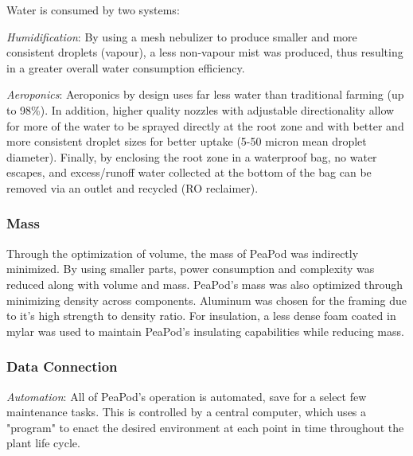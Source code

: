 \documentclass{report}
\begin{document}

Water is consumed by two systems:

\textit{Humidification}: By using a mesh nebulizer to produce smaller and more consistent droplets (vapour), a less non-vapour mist was produced, thus resulting in a greater overall water consumption efficiency.

\textit{Aeroponics}: Aeroponics by design uses far less water than traditional farming (up to 98\%). In addition, higher quality nozzles with adjustable directionality allow for more of the water to be sprayed directly at the root zone and with better and more consistent droplet sizes for better uptake (5-50 micron mean droplet diameter). Finally, by enclosing the root zone in a waterproof bag, no water escapes, and excess/runoff water collected at the bottom of the bag can be removed via an outlet and recycled (RO reclaimer).

\subsubsection{Mass} 
\label{sec:constraints-mass}

Through the optimization of volume, the mass of PeaPod was indirectly minimized. By using smaller parts, power consumption and complexity was reduced along with volume and mass. PeaPod's mass was also optimized through minimizing density across components. Aluminum was chosen for the framing due to it's high strength to density ratio. For insulation, a less dense foam coated in mylar was used to maintain PeaPod's insulating capabilities while reducing mass.

\subsubsection{Data Connection} 
\label{sec:constraints-data}



\textit{Automation}: All of PeaPod's operation is automated, save for a select few maintenance tasks. This is controlled by a central computer, which uses a "program" to enact the desired environment at each point in time throughout the plant life cycle. 
\end{document}
